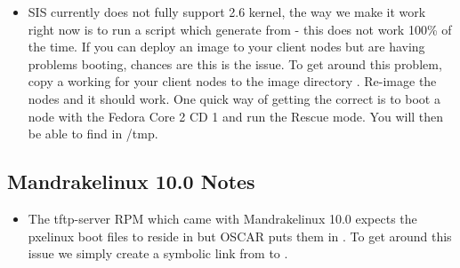 \begin{itemize}

\item SIS currently does not fully support 2.6 kernel, the way we make it
  work right now is to run a script which generate 
  from  - this does not work 100\% of the time.  If
  you can deploy an image to your client nodes but are having problems
  booting, chances are this is the issue.  To get around this problem, copy a
  working  for your client nodes to the image directory
  .  Re-image the
  nodes and it should work.  One quick way of getting the correct
   is to boot a node with the Fedora Core 2 CD 1
  and run the Rescue mode.  You will then be able to find
   in \-/tmp.

\end{itemize}


\subsection{Mandrakelinux 10.0 Notes}
\label{subsec:mdk10notes}

\begin{itemize}

\item The tftp-server RPM which came with Mandrakelinux 10.0 expects the
pxelinux boot files to reside in  but OSCAR puts
them in .  To get around this issue we simply create a
symbolic link from  to . 

\end{itemize}
